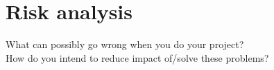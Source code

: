 \chapter{Risk analysis}
\label{chapter:7}

What can possibly go wrong when you do your project? \\
How do you intend to reduce impact of/solve these problems?